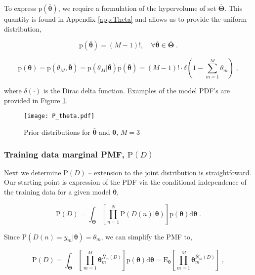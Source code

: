 \documentclass[12pt]{article}
\begin{document}
To express $\text{p}\left(\bar{\bm{\theta}}\right)$, we require a formulation of the hypervolume of set $\bar{\bm{\Theta}}$. This quantity is found in Appendix \ref{app:Theta} and allows us to provide the uniform distribution,

\begin{equation}
\text{p}\left(\bar{\bm{\theta}}\right)= (M-1)!,  \quad \forall \bar{\bm{\theta}} \in \bar{\bm{\Theta}} \;.
\end{equation}

\begin{equation}
\text{p}(\bm{\theta}) = \text{p}(\theta_M,\bar{\bm{\theta}}) = \text{p}\left( \theta_M | \bar{\bm{\theta}} \right) \text{p}\left(\bar{\bm{\theta}}\right)
= (M-1)! \cdot \delta\left( 1 - \sum_{m=1}^M \theta_m \right) \;,
\end{equation}

where $\delta(\cdot)$ is the Dirac delta function. Examples of the model PDF's are provided in Figure \ref{fig:P_theta}.

\begin{figure}
\centering
\texttt{[image: P\_theta.pdf]}
\caption{Prior distributions for $\bar{\bm{\theta}}$ and $\bm{\theta}$, $M=3$}
\label{fig:P_theta}
\end{figure}


\subsubsection{Training data marginal PMF, $\text{P}(D)$}

Next we determine $\text{P}(D)$ -- extension to the joint distribution is straightfoward. Our starting point is expression of the PDF via the conditional independence of the training data for a given model $\bm{\theta}$,

\begin{equation}
\text{P}(D) = \int_{\bm{\Theta}} \left[ \prod_{n=1}^N \text{P}(D(n) | \bm{\theta}) \right] \text{p}(\bm{\theta}) \mathrm{d}\bm{\theta} \;.
\end{equation}

Since $\text{P}(D(n) = y_m | \bm{\theta}) = \theta_m$, we can simplify the PMF to,

\begin{equation} \label{P_D_int2}
\text{P}(D) = \int_{\bm{\Theta}} \left[ \prod_{m=1}^M \bm{\theta}_m^{\bar{N}_m(D)} \right] \text{p}(\bm{\theta}) \mathrm{d}\bm{\theta} 
= \text{E}_{\bm{\theta}} \left[ \prod_{m=1}^M \bm{\theta}_m^{\bar{N}_m(D)} \right] \;,
\end{equation}
\end{document}
